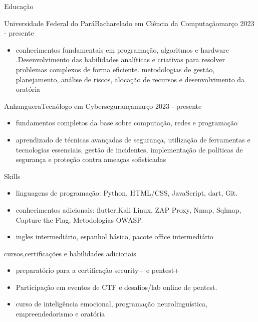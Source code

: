 \documentclass[]{mcdowellcv}
\begin{document}
\begin{cvsection}{Educação}
	\begin{cvsubsection}{Universidade Federal do Pará}{Bacharelado em Ciência da Computação}{março 2023 - presente}
		\begin{itemize}
                \vspace{\baselineskip}
			\item conhecimentos fundamentais em programação, algoritmos e hardware .Desenvolvimento das habilidades analíticas e criativas para resolver 
            problemas complexos de forma eficiente. metodologias de gestão, planejamento, análise de riscos, alocação de recursos e desenvolvimento da oratória
		\end{itemize}
	\end{cvsubsection}
	\begin{cvsubsection}{Anhanguera}{Tecnólogo em Cybersegurança}{março 2023 - presente}
		\begin{itemize}
                \item fundamentos completos da base sobre computação, redes e programação
			\item aprendizado de técnicas avançadas de segurança, utilização de ferramentas e tecnologias essenciais, gestão de incidentes, implementação de políticas de segurança e proteção contra ameaças sofisticadas
		\end{itemize}
	\end{cvsubsection}
\end{cvsection}

\begin{cvsection}{Skills}
	\begin{cvsubsection}{}{}{}
		\begin{itemize}
			\item linguagens de programação: Python, HTML/CSS, JavaScript, dart, Git.
			\item conhecimentos adicionais: flutter,Kali Linux, ZAP Proxy, Nmap, Sqlmap, Capture the Flag, Metodologias OWASP.
                \item ingles intermediário, espanhol básico, pacote office intermediário
		\end{itemize}
	\end{cvsubsection}
\end{cvsection}
\begin{cvsection}{cursos,certificações e habilidades adicionais}
	\begin{cvsubsection}{}{}{}
		\begin{itemize}
                \item preparatório para a certificação security+ e pentest+
			\item Participação em eventos de CTF e desafios/lab online de pentest.
                \item curso de inteligência emocional, programação neurolinguística, empreendedorismo e oratória
		\end{itemize}
	\end{cvsubsection}
\end{cvsection}
\end{document}

